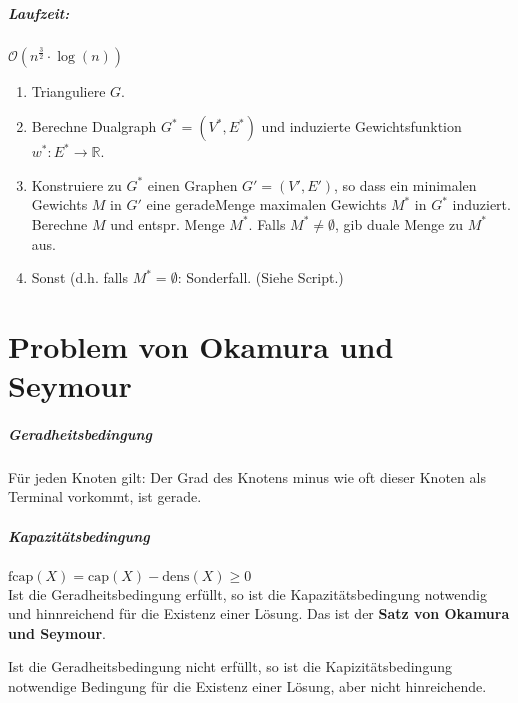 \documentclass[a4paper,11pt]{report}
\begin{document}
\paragraph{Laufzeit:} $\mathcal{O}(n^{\frac{3}{2}} \cdot \log(n))$

\begin{enumerate}
    \item Trianguliere $G$.
    \item Berechne Dualgraph $G^* = (V^*, E^*)$ und induzierte Gewichtsfunktion $w^* : E^* \rightarrow \mathbb{R}$.
    \item Konstruiere zu $G^*$ einen Graphen $G' = (V', E')$, so dass ein  minimalen Gewichts $M$ in $G'$ eine \gls{geradeMenge} maximalen Gewichts $M^*$ in $G^*$ induziert. Berechne $M$ und entspr. Menge $M^*$. Falls $M^* \neq \emptyset$, gib duale Menge zu $M^*$ aus.
    \item Sonst (d.h. falls $M^* = \emptyset$: Sonderfall. (Siehe Script.)
\end{enumerate}


\chapter{Problem von Okamura und Seymour}
\paragraph{Geradheitsbedingung}
Für jeden Knoten gilt: Der Grad des Knotens minus wie oft dieser Knoten als Terminal vorkommt, ist gerade.

\paragraph{Kapazitätsbedingung} $\text{fcap}(X) = \text{cap}(X) - \text{dens}(X) \geq 0$\\

Ist die Geradheitsbedingung erfüllt, so ist die Kapazitätsbedingung notwendig und hinnreichend für die Existenz einer Lösung. Das ist der \textbf{Satz von Okamura und Seymour}.

Ist die Geradheitsbedingung nicht erfüllt, so ist die Kapizitätsbedingung notwendige Bedingung für die Existenz einer Lösung, aber nicht hinreichende.
\end{document}
